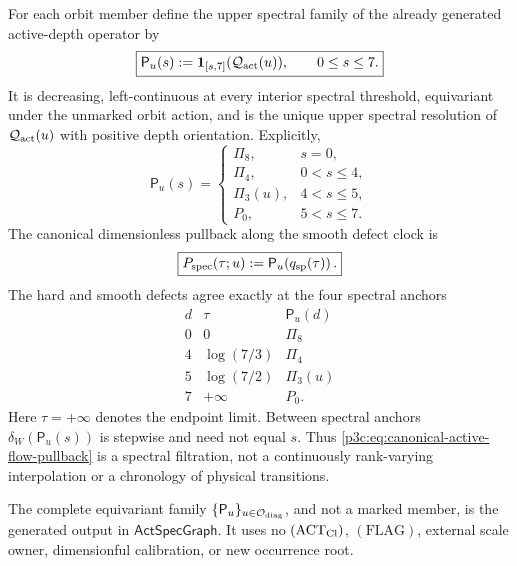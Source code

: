 \documentclass[12pt,a4paper]{article}
\begin{document}
\begin{theorem}
For each orbit member define the upper spectral family of the already
generated active-depth operator by
\begin{equation}
\label{p3c:eq:canonical-active-upper-filtration}
 \boxed{\mathsf P_u(s):=\mathbf1_{[s,7]}
       (\mathcal Q_{\rm act}(u)),\qquad 0\le s\le7.}
\end{equation}
It is decreasing, left-continuous at every interior spectral threshold,
equivariant under the unmarked orbit action, and is the unique upper spectral
resolution of \(\mathcal Q_{\rm act}(u)\) with positive depth orientation.
Explicitly,
\begin{equation}
\label{p3c:eq:canonical-active-upper-filtration-steps}
 \mathsf P_u(s)=
 \begin{cases}
  \Pi_8,&s=0,\\
  \Pi_4,&0<s\le4,\\
  \Pi_3(u),&4<s\le5,\\
  P_0,&5<s\le7.
 \end{cases}
\end{equation}
The canonical dimensionless pullback along the smooth defect clock is
\begin{equation}
\label{p3c:eq:canonical-active-flow-pullback}
 \boxed{P_{\rm spec}(\tau;u)
 :=\mathsf P_u\!\left(q_{\rm sp}(\tau)\right).}
\end{equation}
The hard and smooth defects agree exactly at the four spectral anchors
\begin{equation}
\label{p3c:eq:hard-smooth-defect-anchors}
\begin{array}{c|c|c}
 d & \tau & \mathsf P_u(d)\\ \hline
 0&0&\Pi_8\\
 4&\log(7/3)&\Pi_4\\
 5&\log(7/2)&\Pi_3(u)\\
 7&+\infty&P_0.
\end{array}
\end{equation}
Here \(\tau=+\infty\) denotes the endpoint limit.  Between spectral anchors
\(\delta_W(\mathsf P_u(s))\) is stepwise and need not equal \(s\).
Thus \eqref{p3c:eq:canonical-active-flow-pullback} is a spectral filtration,
not a continuously rank-varying interpolation or a chronology of physical
transitions.

The complete equivariant family
\(\{\mathsf P_u\}_{u\in\mathcal O_{\rm diag}}\), and not a marked member, is
the generated output in \(\mathsf{ActSpecGraph}\).  It uses no
\((\mathrm{ACT}_{\rm Cl})\), \((\mathrm{FLAG})\), external scale owner,
dimensionful calibration, or new occurrence root.
\end{theorem}
\end{document}
